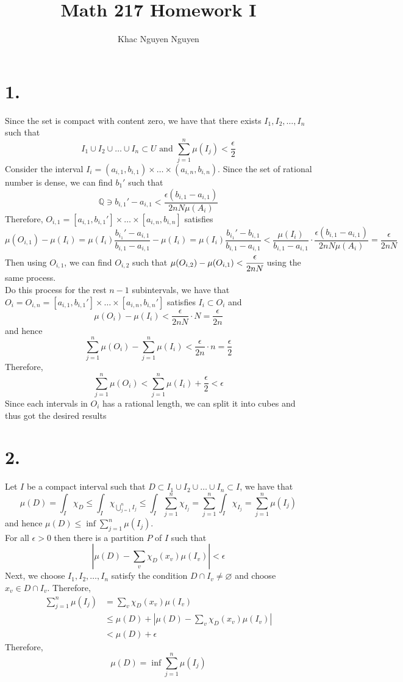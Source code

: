 \documentclass[11pt]{article}
\title{\textbf{Math 217 Homework I}}
\author{Khac Nguyen Nguyen}
\date{}
\begin{document}
\section*{1.}
Since the set is compact with content zero, we have that there exists $I_1, I_2, \ldots, I_n$ such that
\[
    I_1 \cup I_2 \cup \ldots \cup I_n \subset U \text{ and } \sum_{j=1}^n \mu(I_j) < \frac{\epsilon}{2} 
\]
Consider the interval $I_i = (a_{i,1}, b_{i,1}) \times \ldots \times (a_{i,n}, b_{i,n})$. 
Since the set of rational number is dense, we can find $b_1'$ such that 
\[
    \mathbb{Q} \ni b_{i,1}' - a_{i,1} < \frac{\epsilon (b_{i,1}- a_{i,1})}{2nN\mu(A_i)}
\]
Therefore, $O_{i,1} = [a_{i,1}, b_{i,1}'] \times \ldots \times [a_{i,n}, b_{i,n}]$ satisfies
\[
    \mu(O_{i,1}) - \mu(I_i) 
    = \mu(I_i) \frac{b_{i_1}' - a_{i,1}}{b_{i,1} - a_{i,1}} -\mu(I_i) 
    = \mu(I_i)\frac{b_{i_1}' - b_{i,1}}{b_{i,1} - a_{i,1}} 
    < \frac{\mu(I_i)}{b_{i,1} - a_{i,1}} \cdot \frac{\epsilon (b_{i,1}- a_{i,1})}{2nN\mu(A_i)} 
    = \frac{\epsilon}{2nN}
\]
Then using $O_{i,1}$, we can find $O_{i,2}$ such that $\mu(O_{i,2}) - \mu(O_{i,1}) < \cfrac{\epsilon}{2nN}$ using the same process. \\
Do this process for the rest $n-1$ subintervals, 
we have that $O_i = O_{i,n} = [a_{i,1}, b_{i,1}'] \times \ldots \times [a_{i,n}, b_{i,n}']$ satisfies $I_i \subset O_i$ and 
\[
    \mu(O_i) - \mu(I_i) < \frac{\epsilon}{2nN} \cdot N = \frac{\epsilon}{2n}
\]
and hence
\[
    \sum_{j=1}^n \mu(O_i) - \sum_{j=1}^n \mu(I_i) < \frac{\epsilon}{2n} \cdot n = \frac{\epsilon}{2}    
\]
Therefore, 
\[
    \sum_{j=1}^n \mu(O_i) < \sum_{j=1}^n \mu(I_i) + \frac{\epsilon}{2} < \epsilon    
\]
Since each intervals in $O_i$ has a rational length, we can split it into cubes and thus got the desired results
\pagebreak
\section*{2.}
Let $I$ be a compact interval such that  $D \subset I_1 \cup I_2 \cup \ldots \cup I_n \subset I$, we have that 
\[
    \mu(D) = \int_I \chi_D \le \int_I \chi_{\bigcup_{j=1}^n I_j} \le \int_I \sum_{j=1}^n \chi_{I_j} = \sum_{j=1}^n \int_I \chi_{I_j} = \sum_{j=1}^n \mu(I_j)    
\]
and hence $\mu(D) \le \inf \sum_{j=1}^n \mu(I_j)$. \\
For all $\epsilon >0$ then there is a partition $P$ of $I$ such that 
\[
    \left| \mu(D) - \sum_v \chi_D(x_v)\mu(I_v) \right| < \epsilon    
\] 
Next, we choose $I_1, I_2, \ldots, I_n$ satisfy the condition $D \cap I_v \ne \varnothing$ 
and choose $x_v \in D \cap I_v$. 
Therefore, 
\begin{equation*}
    \begin{aligned}
        \sum_{j=1}^n \mu(I_j) &= \sum_v \chi_D(x_v)\mu(I_v) \\
        &\le \mu(D) + \left| \mu(D) - \sum_v \chi_D(x_v) \mu(I_v) \right| \\
        &< \mu(D) + \epsilon     
    \end{aligned}
\end{equation*}
Therefore, 
\[
    \mu(D) = \inf \sum_{j=1}^n \mu(I_j)    
\]
\pagebreak
\end{document}
